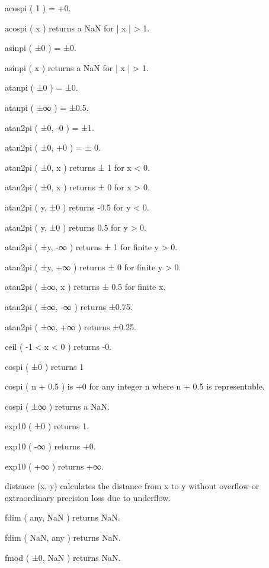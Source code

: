 
acospi ( 1 ) = +0.\par
acospi ( x ) returns a NaN for | x | > 1.\par

asinpi ( ±0 ) = ±0.\par
asinpi ( x ) returns a NaN for | x | > 1.\par

atanpi ( ±0 ) = ±0.\par
atanpi ( ±∞ ) = ±0.5.\par

atan2pi ( ±0, -0 ) = ±1.\par
atan2pi ( ±0, +0 ) = ± 0.\par
atan2pi ( ±0, x ) returns ± 1 for x < 0.\par
atan2pi ( ±0, x ) returns ± 0 for x > 0.\par
atan2pi ( y, ±0 ) returns -0.5 for y < 0.\par
atan2pi ( y, ±0 ) returns 0.5 for y > 0.\par
atan2pi ( ±y, -∞ ) returns ± 1 for finite y > 0.\par
atan2pi ( ±y, +∞ ) returns ± 0 for finite y > 0.\par
atan2pi ( ±∞, x ) returns ± 0.5 for finite x.\par
atan2pi ( ±∞, -∞ ) returns ±0.75.\par
atan2pi ( ±∞, +∞ ) returns ±0.25.\par

ceil ( -1 < x < 0 ) returns -0.\par

cospi ( ±0 ) returns 1\par
cospi ( n + 0.5 ) is +0 for any integer n where n + 0.5 is representable.\par
cospi ( ±∞ ) returns a NaN.\par

exp10 ( ±0 ) returns 1.\par
exp10 ( -∞ ) returns +0.\par
exp10 ( +∞ ) returns +∞.\par

distance (x, y) calculates the distance from x to y without overflow or extraordinary
precision loss due to underflow.\par

fdim ( any, NaN ) returns NaN.\par
fdim ( NaN, any ) returns NaN.\par

fmod ( ±0, NaN ) returns NaN.\par

